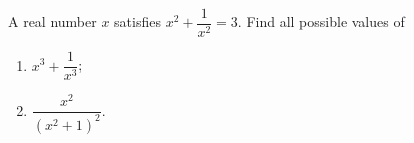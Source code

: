 A real number $x$ satisfies $x^2+\dfrac{1}{x^2}=3$. Find all possible values of
\begin{enumerate}
\item[(a)] $x^3+\dfrac{1}{x^3}$;
\item[(b)] $\dfrac{x^2}{(x^2+1)^2}$.
\end{enumerate}
